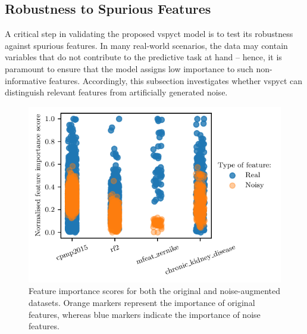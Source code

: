 \documentclass[3p,review,authoryear]{elsarticle}
\begin{document}
\subsection{Robustness to Spurious Features}%
\label{sec:noise_features}

A critical step in validating the proposed \gls{vspyct} model is to test its robustness against spurious features. 
In many real-world scenarios, the data may contain variables that do not contribute to the predictive task at hand -- hence, it is paramount to ensure that the model assigns low importance to such non-informative features. 
Accordingly, this subsection investigates whether \gls{vspyct} can distinguish relevant features from artificially generated noise.

\begin{figure}[h!]
    \centering
    \includegraphics{../figures/feat_importances.pdf}
    \caption{Feature importance scores for both the original and noise-augmented datasets.
    Orange markers represent the importance of original features, whereas blue markers indicate the importance of noise features.}
    \label{fig:feature_importances}
\end{figure}
\end{document}
